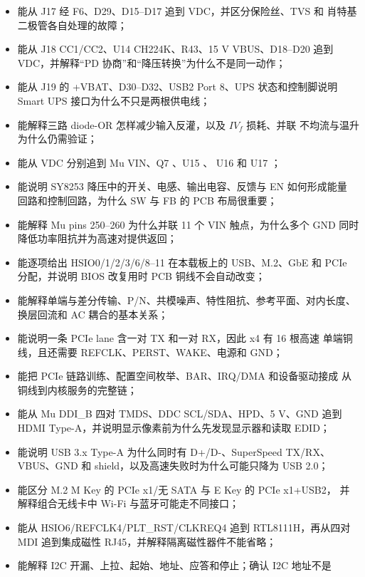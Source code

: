 \begin{itemize}
        3961 段走线、1307 个过孔、\(146\mathrm{mm}\times102\mathrm{mm}\)
        板框与约 1.6062 mm 四层叠层分别证明什么；
  \item 能从 J17 经 F6、D29、D15--D17 追到 VDC，并区分保险丝、TVS 和
        肖特基二极管各自处理的故障；
  \item 能从 J18 CC1/CC2、U14 CH224K、R43、15 V VBUS、D18--D20 追到
        VDC，并解释“PD 协商”和“降压转换”为什么不是同一动作；
  \item 能从 J19 的 +VBAT、D30--D32、USB2 Port 8、UPS 状态和控制脚说明
        Smart UPS 接口为什么不只是两根供电线；
  \item 能解释三路 diode-OR 怎样减少输入反灌，以及 \(I V_f\) 损耗、并联
        不均流与温升为什么仍需验证；
  \item 能从 VDC 分别追到 Mu VIN、Q7 、U15 、
        U16  和 U17 ；
  \item 能说明 SY8253 降压中的开关、电感、输出电容、反馈与 EN 如何形成能量
        回路和控制回路，为什么 SW 与 FB 的 PCB 布局很重要；
  \item 能解释 Mu pins 250--260 为什么并联 11 个 VIN 触点，为什么多个 GND
        同时降低功率阻抗并为高速对提供返回；
  \item 能逐项给出 HSIO0/1/2/3/6/8--11 在本载板上的 USB、M.2、GbE 和
        PCIe 分配，并说明 BIOS 改复用时 PCB 铜线不会自动改变；
  \item 能解释单端与差分传输、P/N、共模噪声、特性阻抗、参考平面、对内长度、
        换层回流和 AC 耦合的基本关系；
  \item 能说明一条 PCIe lane 含一对 TX 和一对 RX，因此 x4 有 16 根高速
        单端铜线，且还需要 REFCLK、PERST、WAKE、电源和 GND；
  \item 能把 PCIe 链路训练、配置空间枚举、BAR、IRQ/DMA 和设备驱动接成
        从铜线到内核服务的完整链；
  \item 能从 Mu DDI\_B 四对 TMDS、DDC SCL/SDA、HPD、5 V、GND 追到 HDMI
        Type-A，并说明显示像素前为什么先发现显示器和读取 EDID；
  \item 能说明 USB 3.x Type-A 为什么同时有 D+/D-、SuperSpeed TX/RX、
        VBUS、GND 和 shield，以及高速失败时为什么可能只降为 USB 2.0；
  \item 能区分 M.2 M Key 的 PCIe x1/无 SATA 与 E Key 的 PCIe x1+USB2，
        并解释组合无线卡中 Wi-Fi 与蓝牙可能走不同接口；
  \item 能从 HSIO6/REFCLK4/PLT\_RST/CLKREQ4 追到 RTL8111H，再从四对 MDI
        追到集成磁性 RJ45，并解释隔离磁性器件不能省略；
  \item 能解释 I2C 开漏、上拉、起始、地址、应答和停止；确认 I2C 地址不是

\end{itemize}
